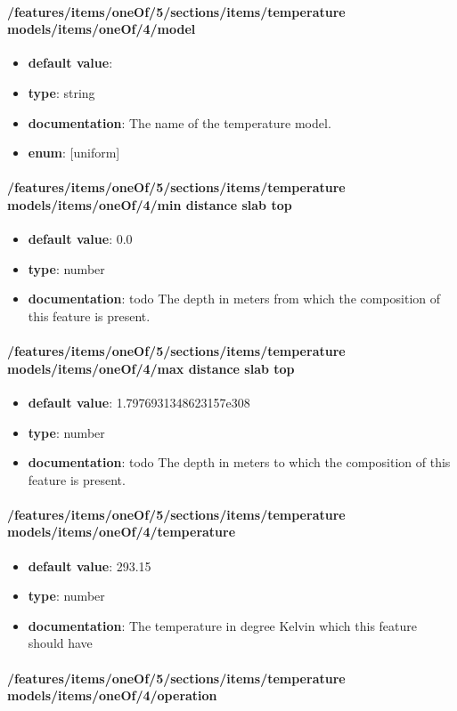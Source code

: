 \paragraph{/features/items/oneOf/5/sections/items/temperature models/items/oneOf/4/model}
\begin{itemize}\item {\bf default value}: 
\item {\bf type}: string
\item {\bf documentation}: The name of the temperature model.
\item {\bf enum}: [uniform]\end{itemize}\paragraph{/features/items/oneOf/5/sections/items/temperature models/items/oneOf/4/min distance slab top}
\begin{itemize}\item {\bf default value}: 0.0
\item {\bf type}: number
\item {\bf documentation}: todo The depth in meters from which the composition of this feature is present.
\end{itemize}\paragraph{/features/items/oneOf/5/sections/items/temperature models/items/oneOf/4/max distance slab top}
\begin{itemize}\item {\bf default value}: 1.7976931348623157e308
\item {\bf type}: number
\item {\bf documentation}: todo The depth in meters to which the composition of this feature is present.
\end{itemize}\paragraph{/features/items/oneOf/5/sections/items/temperature models/items/oneOf/4/temperature}
\begin{itemize}\item {\bf default value}: 293.15
\item {\bf type}: number
\item {\bf documentation}: The temperature in degree Kelvin which this feature should have
\end{itemize}\paragraph{/features/items/oneOf/5/sections/items/temperature models/items/oneOf/4/operation}
